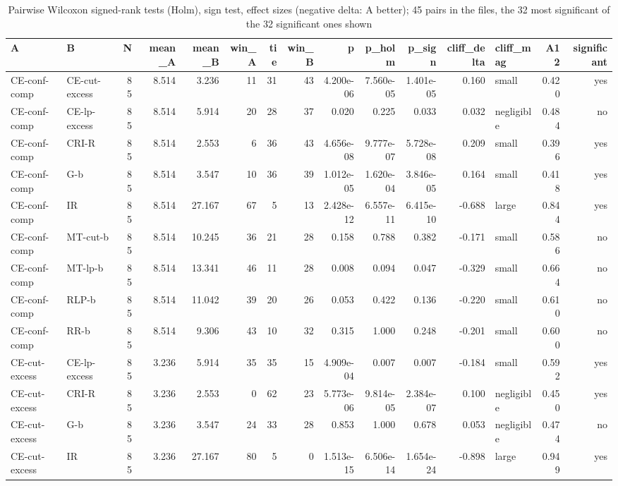 \begin{table}[htbp]
\centering
\small
\caption{Pairwise Wilcoxon signed-rank tests (Holm), sign test, effect sizes (negative delta: A better); 45 pairs in the files, the 32 most significant of the 32 significant ones shown}
\label{tab:E2b_head_to_head_budgets_b1_pairwise}
\begin{tabular}{llrrrrrrrrrrlrr}
\toprule
A & B & N & mean\_A & mean\_B & win\_A & tie & win\_B & p & p\_holm & p\_sign & cliff\_delta & cliff\_mag & A12 & significant \\
\midrule
CE-conf-comp & CE-cut-excess & 85 & 8.514 & 3.236 & 11 & 31 & 43 & 4.200e-06 & 7.560e-05 & 1.401e-05 & 0.160 & small & 0.420 & yes \\
CE-conf-comp & CE-lp-excess & 85 & 8.514 & 5.914 & 20 & 28 & 37 & 0.020 & 0.225 & 0.033 & 0.032 & negligible & 0.484 & no \\
CE-conf-comp & CRI-R & 85 & 8.514 & 2.553 & 6 & 36 & 43 & 4.656e-08 & 9.777e-07 & 5.728e-08 & 0.209 & small & 0.396 & yes \\
CE-conf-comp & G-b & 85 & 8.514 & 3.547 & 10 & 36 & 39 & 1.012e-05 & 1.620e-04 & 3.846e-05 & 0.164 & small & 0.418 & yes \\
CE-conf-comp & IR & 85 & 8.514 & 27.167 & 67 & 5 & 13 & 2.428e-12 & 6.557e-11 & 6.415e-10 & -0.688 & large & 0.844 & yes \\
CE-conf-comp & MT-cut-b & 85 & 8.514 & 10.245 & 36 & 21 & 28 & 0.158 & 0.788 & 0.382 & -0.171 & small & 0.586 & no \\
CE-conf-comp & MT-lp-b & 85 & 8.514 & 13.341 & 46 & 11 & 28 & 0.008 & 0.094 & 0.047 & -0.329 & small & 0.664 & no \\
CE-conf-comp & RLP-b & 85 & 8.514 & 11.042 & 39 & 20 & 26 & 0.053 & 0.422 & 0.136 & -0.220 & small & 0.610 & no \\
CE-conf-comp & RR-b & 85 & 8.514 & 9.306 & 43 & 10 & 32 & 0.315 & 1.000 & 0.248 & -0.201 & small & 0.600 & no \\
CE-cut-excess & CE-lp-excess & 85 & 3.236 & 5.914 & 35 & 35 & 15 & 4.909e-04 & 0.007 & 0.007 & -0.184 & small & 0.592 & yes \\
CE-cut-excess & CRI-R & 85 & 3.236 & 2.553 & 0 & 62 & 23 & 5.773e-06 & 9.814e-05 & 2.384e-07 & 0.100 & negligible & 0.450 & yes \\
CE-cut-excess & G-b & 85 & 3.236 & 3.547 & 24 & 33 & 28 & 0.853 & 1.000 & 0.678 & 0.053 & negligible & 0.474 & no \\
CE-cut-excess & IR & 85 & 3.236 & 27.167 & 80 & 5 & 0 & 1.513e-15 & 6.506e-14 & 1.654e-24 & -0.898 & large & 0.949 & yes \\

\end{tabular}
\end{table}
